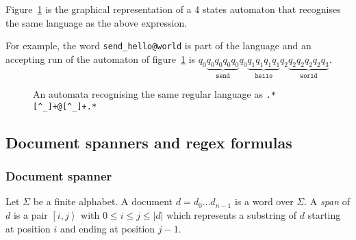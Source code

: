 \documentclass[12px]{article}
\newcommand{\Span}[1]{\left[ #1 \right\rangle}
\begin{document}
        Figure~\ref{fig:automata_simple} is the graphical representation of a 4
        states automaton that recognises the same language as the above
        expression.

        For example, the word \texttt{send\_hello@world} is part of the
        language and an accepting run of the automaton of
        figure~\ref{fig:automata_simple} is $q_0 \underbrace{q_0 q_0 q_0
        q_0}_\texttt{send} q_0 \underbrace{q_1q_1q_1q_1}_\texttt{hello} q_2
        \underbrace{q_2 q_2 q_2 q_2 q_3}_\texttt{world}$.

        \begin{figure}[ht]%
          \label{fig:automata_simple}
          \centering
          \caption{An automata recognising the same regular language as
          \texttt{.*[\textasciicircum\_]+@[\textasciicircum\_]+.*}}
        \end{figure}

    \subsection{Document spanners and regex formulas}

      \subsubsection{Document spanner}

        Let $\Sigma$ be a finite alphabet. A document $d = d_0 \dots d_{n-1}$
        is a word over $\Sigma$. A \textit{span} of $d$ is a pair $\Span{i, j}$
        with $0 \leq i \leq j \leq |d|$ which represents a substring of $d$
        starting at position $i$ and ending at position $j - 1$.
\end{document}
